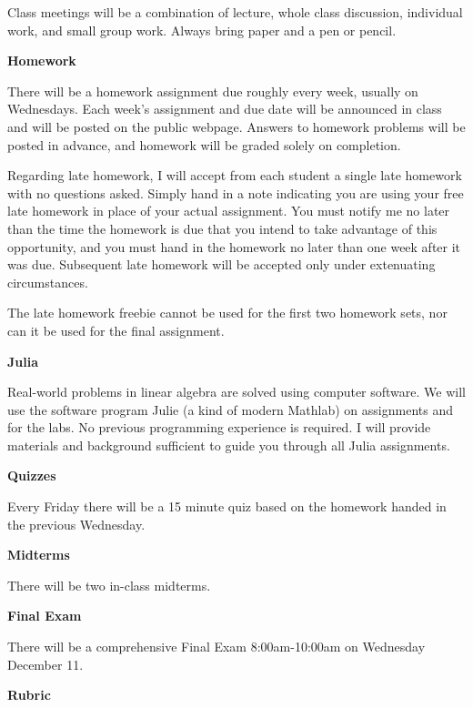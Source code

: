 \documentclass[12pt]{article}
\begin{document}
Class meetings will be a combination of lecture, whole class discussion, individual work, and small group work. Always bring paper and a pen or pencil. 

{\textbf{\large{Homework}}}

There will be a homework assignment due roughly every week, usually on Wednesdays. Each week’s assignment and due date will be announced in class and will be posted on the public webpage. Answers to homework problems will be posted in advance, and homework will be graded solely on completion.

Regarding late homework, I will accept from each student a single late homework with no
questions asked. Simply hand in a note indicating you are using your free late homework in
place of your actual assignment. You must notify me no later than the time the homework is
due that you intend to take advantage of this opportunity, and you must hand in the homework no later than one week after it was due. Subsequent late homework will be accepted only under extenuating circumstances.

The late homework freebie cannot be used for the first two homework sets, nor can it be used for the final assignment.

{\textbf{\large{Julia}}}

Real-world problems in linear algebra are solved using computer software. We will use the software program Julie (a kind of modern Mathlab) on assignments and for the labs. No previous programming experience is required. I will provide materials and background sufficient to guide you through all Julia assignments.

{\textbf{\large{Quizzes}}}

Every Friday there will be a 15 minute quiz based on the homework handed in the previous Wednesday.

%

{\textbf{\large{Midterms}}}

There will be two in-class midterms.

{\textbf{\large{Final Exam}}}

There will be a comprehensive Final Exam 8:00am-10:00am on Wednesday December 11.

{\textbf{\large{Rubric}}}
\end{document}
